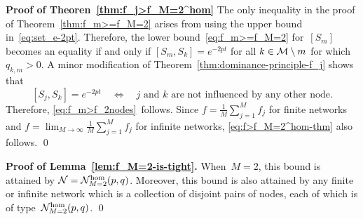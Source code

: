\documentclass[review]{elsarticle}
\begin{document}
{\bf Proof of Theoren~\ref{thm:f_j>f_M=2^hom}}
	The only inequality in the proof of Theorem~\ref{thm:f_m>=f_M=2}
	arises from using the  upper bound in~\eqref{eq:set_e-2pt}.
	Therefore,  the lower bound~\eqref{eq:f_m>=f_M=2} for~$[S_m]$ becomes an equality if and only if  $	[S_m,S_k] = e^{-2 pt}$ for all $k \in {\cal M} \setminus m$ for which $q_{k,m}>0$. A minor modification of
	Theorem~\ref{thm:dominance-principle-f_j} shows that  
	$$
	[S_j,S_k] = e^{-2 pt} \quad \iff \quad \text{$j$ and $k$ are not influenced by any other node}.
	$$
	Therefore, \eqref{eq:f_m>f_2nodes}~follows.
%	
	Since $f = \frac{1}{M}\sum_{j=1}^M f_j$ for finite networks and
	$f = \lim_{M\rightarrow \infty }\frac{1}{M}\sum_{j=1}^M f_j$ for infinite networks, 	\eqref{eq:f>f_M=2^hom-thm} also follows. \qed


{\bf Proof of Lemma~\ref{lem:f_M=2-is-tight}. }
	When~$M=2$, this bound is attained by ${\cal N}={\cal N}_{M=2}^{\rm hom}(p,q)$. Moreover, 
	this bound is also attained by any finite or infinite network which is 
	a collection of disjoint pairs of nodes, each of which is of type~${\cal N}_{M=2}^{\rm hom}(p,q)$. \qed

	
\end{document}
